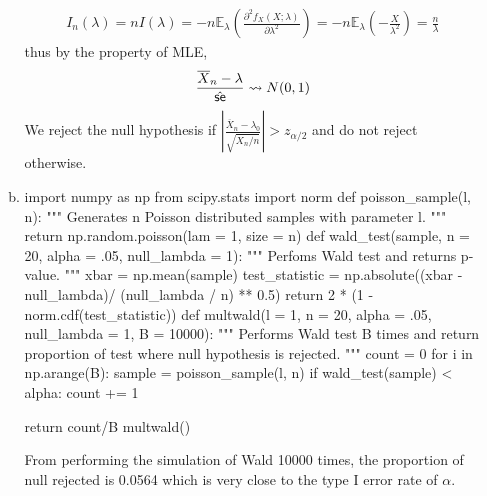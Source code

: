 \documentclass[a4paper,10pt]{article}
\theoremstyle{definition}
\begin{document}
\begin{enumerate}
\begin{enumerate}[(a)]
\begin{align*}
I_n(\lambda) = nI(\lambda)=-n\mathbb{E}_\lambda\left(\frac{\partial^2 f_X(X;\lambda)}{\partial \lambda^2}\right) = -n\mathbb{E}_\lambda\left(-\frac{X}{\lambda^2}\right)=\frac{n}{\lambda}
\end{align*}
thus by the property of  {\sffamily MLE}, 
\begin{align*}
\frac{\overline{X}_n-\lambda}{\hat{\text{\sffamily se}}} \leadsto N(0,1)
\end{align*}
We reject the null hypothesis if $\left|\frac{\overline{X}_n-\lambda_0}{\sqrt{\overline{X}_n/n}}\right|>z_{\alpha/2}$ and do not reject otherwise.
\item 
\begin{python}
import numpy as np
from scipy.stats import norm
def poisson_sample(l, n):
    """
    Generates n Poisson distributed samples with parameter l.
    """
    return np.random.poisson(lam = 1, size = n)
def wald_test(sample, n = 20, alpha = .05, null_lambda = 1):
    """
    Perfoms Wald test and returns p-value.
    """
    xbar = np.mean(sample)
    test_statistic = np.absolute((xbar - null_lambda)/ (null_lambda / n) ** 0.5)
    return  2 * (1 - norm.cdf(test_statistic))
def multwald(l = 1, n = 20, alpha = .05, null_lambda = 1, B = 10000):
    """
    Performs Wald test B times and return proportion of test where null hypothesis is rejected.
    """
    count = 0
    for i in np.arange(B):
        sample = poisson_sample(l, n)
        if wald_test(sample) < alpha:
            count += 1

    return count/B
multwald()            
\end{python}
From performing the simulation of Wald 10000 times, the proportion of null rejected is 0.0564 which is very close to the type I error rate of $\alpha$.
\end{enumerate}

\newpage


\end{enumerate}
\end{document}
